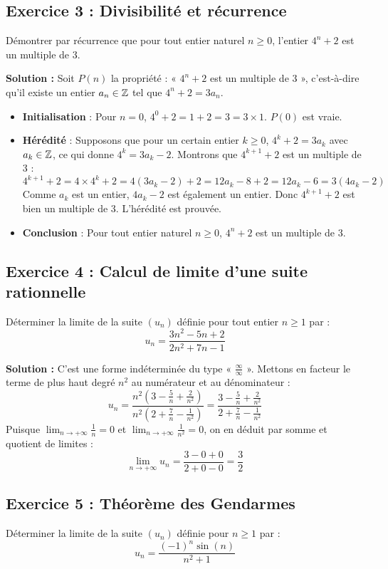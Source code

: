 \subsection*{Exercice 3 : Divisibilité et récurrence}
Démontrer par récurrence que pour tout entier naturel $n \ge 0$, l'entier $4^n + 2$ est un multiple de 3.

\textbf{Solution :}
Soit $P(n)$ la propriété : « $4^n + 2$ est un multiple de 3 », c'est-à-dire qu'il existe un entier $a_n \in \mathbb{Z}$ tel que $4^n + 2 = 3 a_n$.
\begin{itemize}
    \item \textbf{Initialisation} : Pour $n=0$, $4^0 + 2 = 1 + 2 = 3 = 3 \times 1$. $P(0)$ est vraie.
    \item \textbf{Hérédité} : Supposons que pour un certain entier $k \ge 0$, $4^k + 2 = 3 a_k$ avec $a_k \in \mathbb{Z}$, ce qui donne $4^k = 3 a_k - 2$.
    Montrons que $4^{k+1} + 2$ est un multiple de 3 :
    \[
    4^{k+1} + 2 = 4 \times 4^k + 2 = 4(3 a_k - 2) + 2 = 12 a_k - 8 + 2 = 12 a_k - 6 = 3(4a_k - 2)
    \]
    Comme $a_k$ est un entier, $4a_k - 2$ est également un entier. Donc $4^{k+1} + 2$ est bien un multiple de 3. L'hérédité est prouvée.
    \item \textbf{Conclusion} : Pour tout entier naturel $n \ge 0$, $4^n + 2$ est un multiple de 3.
\end{itemize}

\subsection*{Exercice 4 : Calcul de limite d'une suite rationnelle}
Déterminer la limite de la suite $(u_n)$ définie pour tout entier $n \ge 1$ par :
\[
u_n = \frac{3n^2 - 5n + 2}{2n^2 + 7n - 1}
\]

\textbf{Solution :}
C'est une forme indéterminée du type « $\frac{\infty}{\infty}$ ». Mettons en facteur le terme de plus haut degré $n^2$ au numérateur et au dénominateur :
\[
u_n = \frac{n^2 \left( 3 - \frac{5}{n} + \frac{2}{n^2} \right)}{n^2 \left( 2 + \frac{7}{n} - \frac{1}{n^2} \right)} = \frac{3 - \frac{5}{n} + \frac{2}{n^2}}{2 + \frac{7}{n} - \frac{1}{n^2}}
\]
Puisque $\lim_{n \to +\infty} \frac{1}{n} = 0$ et $\lim_{n \to +\infty} \frac{1}{n^2} = 0$, on en déduit par somme et quotient de limites :
\[
\lim_{n \to +\infty} u_n = \frac{3 - 0 + 0}{2 + 0 - 0} = \frac{3}{2}
\]

\subsection*{Exercice 5 : Théorème des Gendarmes}
Déterminer la limite de la suite $(u_n)$ définie pour $n \ge 1$ par :
\[
u_n = \frac{(-1)^n \sin(n)}{n^2 + 1}
\]

